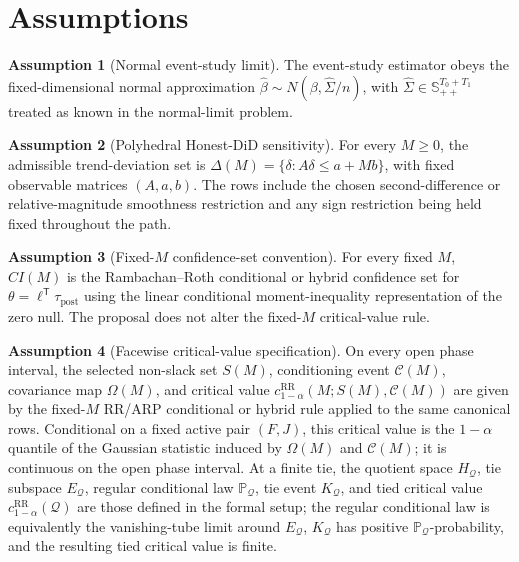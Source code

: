 \documentclass[11pt]{article}
\renewcommand{\Pr}{\mathbb{P}}
\newcommand{\transpose}{\mathsf{T}}
\theoremstyle{definition}
\newtheorem{assumption}{Assumption}
\theoremstyle{plain}
\theoremstyle{remark}
\begin{document}
\section{Assumptions}
\begin{assumption}[Normal event-study limit]\label{ass:normal}
The event-study estimator obeys the fixed-dimensional normal approximation
\(\widehat\beta\sim N(\beta,\widehat\Sigma/n)\), with
\(\widehat\Sigma\in\mathbb{S}_{++}^{T_0+T_1}\) treated as known in the
normal-limit problem.
\end{assumption}

\begin{assumption}[Polyhedral Honest-DiD sensitivity]\label{ass:poly}
For every \(M\ge 0\), the admissible trend-deviation set is
\(\Delta(M)=\{\delta:A\delta\le a+Mb\}\), with fixed observable matrices
\((A,a,b)\).  The rows include the chosen second-difference or
relative-magnitude smoothness restriction and any sign restriction being held
fixed throughout the path.
\end{assumption}

\begin{assumption}[Fixed-\(M\) confidence-set convention]\label{ass:fixedM}
For every fixed \(M\), \(CI(M)\) is the Rambachan--Roth conditional or hybrid
confidence set for \(\theta=\ell^\transpose\tau_{\mathrm{post}}\) using the
linear conditional moment-inequality representation of the zero null.  The
proposal does not alter the fixed-\(M\) critical-value rule.
\end{assumption}

\begin{assumption}[Facewise critical-value specification]\label{ass:critical}
On every open phase interval, the selected non-slack set \(S(M)\), conditioning
event \(\mathcal{C}(M)\), covariance map \(\Omega(M)\), and critical value
\(c_{1-\alpha}^{\mathrm{RR}}(M;S(M),\mathcal{C}(M))\) are given by the
fixed-\(M\) RR/ARP conditional or hybrid rule applied to the same canonical
rows.  Conditional on a fixed active pair \((F,J)\), this critical value is
the \(1-\alpha\) quantile of the Gaussian statistic induced by
\(\Omega(M)\) and \(\mathcal{C}(M)\); it is continuous on the open phase
interval.  At a finite tie, the quotient space \(H_{\mathcal{Q}}\), tie
subspace \(E_{\mathcal{Q}}\), regular conditional law
\(\Pr_{\mathcal{Q}}\), tie event \(K_{\mathcal{Q}}\), and tied critical value
\(c_{1-\alpha}^{\mathrm{RR}}(\mathcal{Q})\) are those defined in the formal
setup; the regular conditional law is equivalently the vanishing-tube limit
around \(E_{\mathcal{Q}}\), \(K_{\mathcal{Q}}\) has positive
\(\Pr_{\mathcal{Q}}\)-probability, and the resulting tied critical value is
finite.
\end{assumption}
\end{document}
